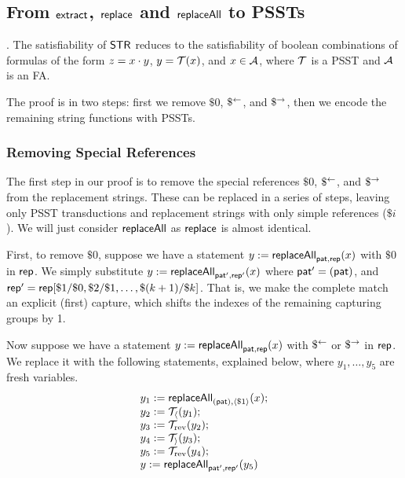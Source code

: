 \subsection{From $\mathsf{extract}$, $\mathsf{replace}$ and $\mathsf{replaceAll}$ to PSSTs}\label{appendix:sec-extract-replace-to-psst}

.
    The satisfiability of $\mathsf{STR}$ reduces to the satisfiability of boolean combinations of formulas of the form $z=x \cdot y$, $y=\mathcal{T}(x)$, and $x \in \mathcal{A}$, where $\mathcal{T}$ is a PSST and $\mathcal{A}$ is an FA.

    The proof is in two steps: first we remove $\$0$, $\$^{\leftarrow}$, and $\$^{\rightarrow}$, then we encode the remaining string functions with PSSTs.

    \subsubsection{Removing Special References}


    The first step in our proof is to remove the special references $\$0$, $\$^{\leftarrow}$, and $\$^{\rightarrow}$ from the replacement strings.
    These can be replaced in a series of steps, leaving only PSST transductions and replacement strings with only simple references ($\$i$).
    We will just consider $\mathsf{replaceAll}$ as $\mathsf{replace}$ is almost identical.

    First, to remove $\$0$, suppose we have a statement
    $y := \mathsf{replaceAll}_{\mathsf{pat}, \mathsf{rep}}(x)$
    with $\$0$ in $\mathsf{rep}$.
    We simply substitute
    $y := \mathsf{replaceAll}_{\mathsf{pat}', \mathsf{rep}'}(x)$
    where
        $\mathsf{pat}' = (\mathsf{pat})$, and
        $\mathsf{rep}' = \mathsf{rep}[\$1 / \$0, \$2 / \$1, \ldots, \$(k+1) / \$k]$.
    That is, we make the complete match an explicit (first) capture, which shifts the indexes of the remaining capturing groups by 1.

    Now suppose we have a statement
    $y := \mathsf{replaceAll}_{\mathsf{pat}, \mathsf{rep}}(x)$
    with $\$^{\leftarrow}$ or $\$^{\rightarrow}$ in $\mathsf{rep}$.
    We replace it with the following statements, explained below, where
    $y_1, \ldots, y_5$
    are fresh variables.
    \[
        \begin{array}{l}
            y_1 := \mathsf{replaceAll}_{(\mathsf{pat}), \langle\$1\rangle}(x); \\
            y_2 := \mathcal{T}_{\langle}(y_1); \\
            y_3 := \mathcal{T}_{\mathrm{rev}}(y_2); \\
            y_4 := \mathcal{T}_{\rangle}(y_3); \\
            y_5 := \mathcal{T}_{\mathrm{rev}}(y_4); \\
            y := \mathsf{replaceAll}_{\mathsf{pat}', \mathsf{rep}'}(y_5)
        \end{array}
    \]

